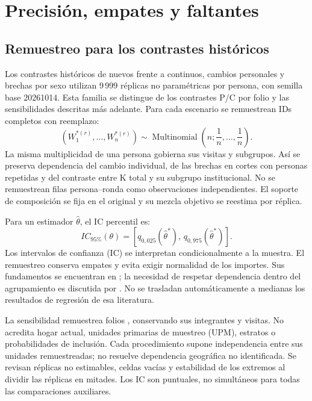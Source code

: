 \section{Precisión, empates y faltantes}
\label{sec:inferencia-condicionada}

\subsection{Remuestreo para los contrastes históricos}

Los contrastes históricos de nuevos frente a continuos, cambios personales
y brechas por sexo utilizan 9\,999 réplicas no paramétricas por persona,
con semilla base 20261014. Esta familia se distingue de los contrastes P/C
por folio y las sensibilidades descritas más adelante. Para cada escenario se remuestrean IDs completos con reemplazo:
\begin{equation}
 (W^{*(r)}_1,\ldots,W^{*(r)}_n)
 \sim\operatorname{Multinomial}\!\left(n;\frac1n,\ldots,\frac1n\right).
 \label{eq:bootstrap-persona}
\end{equation}
La misma multiplicidad de una persona gobierna sus visitas y subgrupos.
Así se preserva dependencia del cambio individual, de las brechas en cortes
con personas repetidas y del contraste entre K total y su subgrupo institucional.
No se remuestrean filas persona--ronda como observaciones independientes.
El soporte de composición se fija en el original y su mezcla objetivo se
reestima por réplica.

Para un estimador $\widehat\theta$, el IC percentil es:
\begin{equation}
 IC_{95\%}(\theta)=
 [q_{0{,}025}(\widehat\theta^{*}),\,
  q_{0{,}975}(\widehat\theta^{*})].
 \label{eq:ic-percentil}
\end{equation}
Los intervalos de confianza (IC) se interpretan condicionalmente a la muestra.
El remuestreo conserva empates y evita exigir normalidad de los importes.
Sus fundamentos se encuentran en \citet{efron1982}; la necesidad de
respetar dependencia dentro del agrupamiento es discutida por
\citet{cameronmiller2015}. No se trasladan automáticamente a medianas los
resultados de regresión de esa literatura.

La sensibilidad remuestrea folios , conservando sus
integrantes y visitas. No acredita hogar actual, unidades primarias de muestreo (UPM), estratos o probabilidades
de inclusión. Cada procedimiento supone independencia entre sus unidades
remuestreadas; no resuelve dependencia geográfica no identificada.
Se revisan réplicas no estimables, celdas vacías y estabilidad de los
extremos al dividir las réplicas en mitades. Los IC son puntuales, no
simultáneos para todas las comparaciones auxiliares.


